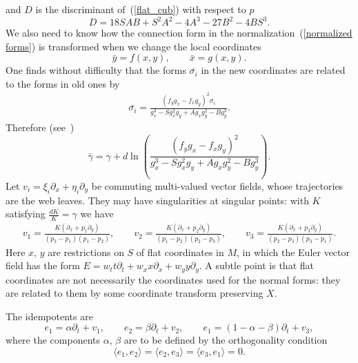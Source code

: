 \documentclass[11pt]{article}
\begin{document}
and $D$ is the discriminant of~(\ref{flat_cub}) with respect to $p$
\[
D=18SAB+S^2A^2-4A^3-27B^2-4BS^3.
\]
We also need to know how the connection form in the normalization~(\ref{normalized forms})
is transformed when we change the local coordinates
\[
\bar{y}=f(x,y), \qquad \bar{x}=g(x,y).
\]
One f\/inds without dif\/f\/iculty that the forms $\bar{\sigma_i}$
in the new coordinates are related to the forms in old ones by
\begin{gather*}%
\bar{\sigma_i}=\frac{(f_yg_x-f_xg_y)^2\sigma_i}{g_x^3-Sg_x^2g_y+Ag_xg_y^2-Bg_y^3}.
\end{gather*}
Therefore (see~\cite{Be})
\begin{equation}\label{connection transforms}
\bar{\gamma}=\gamma+d\ln\left(\frac{(f_yg_x-f_xg_y)^2}{g_x^3-Sg_x^2g_y+Ag_xg_y^2-Bg_y^3}\right).
\end{equation}
Let $v_i=\xi_i \partial_x+\eta_i\partial_y$ be commuting multi-valued vector f\/ields,
whose trajectories are the web leaves. They may have singularities at singular points:
with $K$ satisfying $\frac{dK}{K}=\gamma $ we have
\begin{gather*}%
v_1=\frac{K(\partial_x +p_1 \partial_y)}{(p_3-p_1)(p_1-p_2)},\qquad
v_2=\frac{K(\partial_x +p_2 \partial_y)}{(p_1-p_2)(p_2-p_3)},\qquad
v_3=\frac{K(\partial_x +p_3 \partial_y)}{(p_2-p_3)(p_3-p_1)}.
\end{gather*}
Here $x$, $y$ are restrictions on $S$ of f\/lat coordinates in $M$, in which the Euler vector f\/ield has the form $E=w_tt\partial_t+w_xx\partial_x+w_yy\partial_y$. A subtle point is that f\/lat coordinates are not necessarily the coordinates used for the normal forms: they are related to them by some coordinate transform preserving $X$.

The idempotents are
\begin{equation}\label{idempotents}
e_1=\alpha \partial_t+v_1, \qquad e_2=\beta \partial_t+v_2,\qquad e_1=(1-\alpha -\beta) \partial_t+v_3,
\end{equation}
where the components $\alpha$, $\beta$ are to be def\/ined by the orthogonality condition
\begin{equation}\label{orthogonal}
\langle e_1,e_2\rangle =\langle e_2,e_3\rangle =\langle e_3,e_1\rangle =0.
\end{equation}
\end{document}
